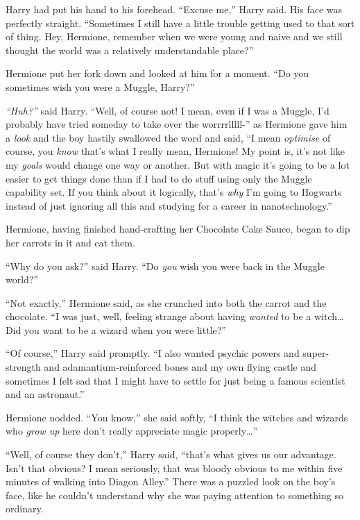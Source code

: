 Harry had put his hand to his forehead. ``Excuse me,'' Harry said. His
face was perfectly straight. ``Sometimes I still have a little trouble
getting used to that sort of thing. Hey, Hermione, remember when we were
young and naive and we still thought the world was a relatively
understandable place?''

Hermione put her fork down and looked at him for a moment. ``Do you
sometimes wish you were a Muggle, Harry?''

\emph{``Huh?''} said Harry. ``Well, of course not! I mean, even if I was
a Muggle, I'd probably have tried someday to take over the
worrrrlllll-'' as Hermione gave him a \emph{look} and the boy hastily
swallowed the word and said, ``I mean \emph{optimise} of course, you
\emph{know} that's what I really mean, Hermione! My point is, it's not
like my \emph{goals} would change one way or another. But with magic
it's going to be a lot easier to get things done than if I had to do
stuff using only the Muggle capability set. If you think about it
logically, that's \emph{why} I'm going to Hogwarts instead of just
ignoring all this and studying for a career in nanotechnology.''

Hermione, having finished hand-crafting her Chocolate Cake Sauce, began
to dip her carrots in it and eat them.

``Why do you ask?'' said Harry. ``Do \emph{you} wish you were back in
the Muggle world?''

``Not exactly,'' Hermione said, as she crunched into both the carrot and
the chocolate. ``I was just, well, feeling strange about having
\emph{wanted} to be a witch\ldots{} Did you want to be a wizard when you
were little?''

``Of course,'' Harry said promptly. ``I also wanted psychic powers and
super-strength and adamantium-reinforced bones and my own flying castle
and sometimes I felt sad that I might have to settle for just being a
famous scientist and an astronaut.''

Hermione nodded. ``You know,'' she said softly, ``I think the witches
and wizards who \emph{grow up} here don't really appreciate magic
properly\ldots{}''

``Well, of course they don't,'' Harry said, ``that's what gives us our
advantage. Isn't that obvious? I mean seriously, that was bloody obvious
to me within five minutes of walking into Diagon Alley.'' There was a
puzzled look on the boy's face, like he couldn't understand why she was
paying attention to something so ordinary.
